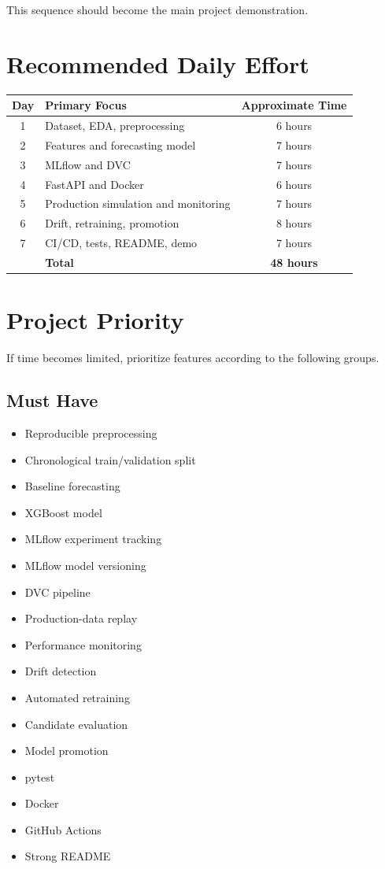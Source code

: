 \documentclass[11pt,a4paper]{article}
\begin{document}
This sequence should become the main project demonstration.

\section{Recommended Daily Effort}

\begin{table}[h]
\centering
\renewcommand{\arraystretch}{1.2}
\begin{tabular}{clc}
\toprule
Day & Primary Focus & Approximate Time \\
\midrule
1 & Dataset, EDA, preprocessing & 6 hours \\
2 & Features and forecasting model & 7 hours \\
3 & MLflow and DVC & 7 hours \\
4 & FastAPI and Docker & 6 hours \\
5 & Production simulation and monitoring & 7 hours \\
6 & Drift, retraining, promotion & 8 hours \\
7 & CI/CD, tests, README, demo & 7 hours \\
\midrule
 & \textbf{Total} & \textbf{48 hours} \\
\bottomrule
\end{tabular}
\end{table}

\section{Project Priority}

If time becomes limited, prioritize features according to the following groups.

\subsection{Must Have}

\begin{itemize}
    \item Reproducible preprocessing
    \item Chronological train/validation split
    \item Baseline forecasting
    \item XGBoost model
    \item MLflow experiment tracking
    \item MLflow model versioning
    \item DVC pipeline
    \item Production-data replay
    \item Performance monitoring
    \item Drift detection
    \item Automated retraining
    \item Candidate evaluation
    \item Model promotion
    \item pytest
    \item Docker
    \item GitHub Actions
    \item Strong README
\end{itemize}
\end{document}

